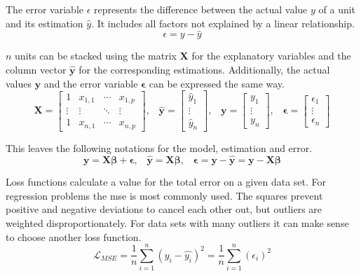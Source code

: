The error variable $\epsilon$ represents the difference between the actual value $y$ of a unit and its estimation $\hat{y}$. It includes all factors not explained by a linear relationship. 
\begin{equation}
    \epsilon = y - \hat{y}
\end{equation}

$n$ units can be stacked using the matrix $\mathbf{X}$ for the explanatory variables and the column vector $\mathbf{\hat{y}}$ for the corresponding estimations. Additionally, the actual values $\mathbf{y}$ and the error variable $\boldsymbol{\epsilon}$ can be expressed the same way.
\begin{equation}
    \mathbf{X} = \begin{bmatrix}1&x_{1,1}&\cdots &x_{1,p}\\\vdots&\vdots&\ddots&\vdots\\1&x_{n,1}&\cdots &x_{n,p}\end{bmatrix}\text{,}\quad
    \mathbf{\hat{y}} = \begin{bmatrix}\hat{y}_1\\\vdots\\\hat{y}_n\end{bmatrix}\text{,}\quad
    \mathbf{y} = \begin{bmatrix}y_1\\\vdots\\y_n\end{bmatrix}\text{,}\quad
    \boldsymbol{\epsilon} = \begin{bmatrix}\epsilon_1\\\vdots\\\epsilon_n\end{bmatrix}
\end{equation}

This leaves the following notations for the model, estimation and error.
\begin{equation}
    \mathbf{y} = \mathbf{X}\boldsymbol{\beta} + \boldsymbol{\epsilon}\text{,}\quad
    \mathbf{\hat{y}} = \mathbf{X}\boldsymbol{\beta}\text{,}\quad
    \boldsymbol{\epsilon} = \mathbf{y} - \mathbf{\hat{y}} = \mathbf{y} - \mathbf{X}\boldsymbol{\beta}
\end{equation}

Loss functions calculate a value for the total error on a given data set. For regression problems the \gls{mse} is most commonly used. The squares prevent positive and negative deviations to cancel each other out, but outliers are weighted disproportionately. For data sets with many outliers it can make sense to choose another loss function. 
\begin{equation}
    \mathcal{L}_{MSE} = \frac{1}{n}\sum_{i=1}^{n} {(y_i - \hat{y_i})}^2 = \frac{1}{n}\sum_{i=1}^{n} {(\epsilon_i)}^2
\end{equation}

